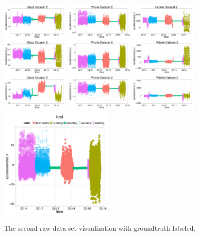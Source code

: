 \begin{figure}
  \centering
  \includegraphics[width=0.3\textwidth]{figures/eda_soda2_glass.pdf}
  \includegraphics[width=0.3\textwidth]{figures/eda_soda2_phone.pdf}
  \includegraphics[width=0.3\textwidth]{figures/eda_soda2_pebble.pdf}
  \includegraphics[width=0.5\textwidth]{figures/legend.pdf}
  \caption{The second raw data set visualization with groundtruth labeled.}
  \label{fig:soda2}
\end{figure}

